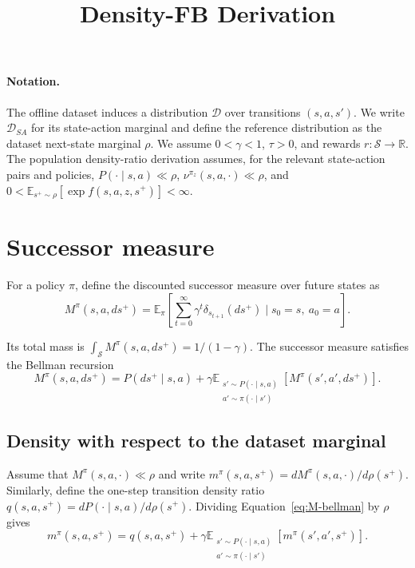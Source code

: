\documentclass[11pt]{article}
\title{Density-FB Derivation}
\date{}
\begin{document}
\maketitle

\paragraph{Notation.}
The offline dataset induces a distribution $\mathcal D$ over transitions $(s,a,s')$. 
We write $\mathcal D_{SA}$ for its state-action marginal and define the reference distribution as the dataset next-state marginal $\rho$. 
We assume $0<\gamma<1$, $\tau>0$, and rewards $r:\mathcal S\rightarrow\mathbb R$. 
The population density-ratio derivation assumes, for the relevant state-action pairs and policies, $P(\cdot\mid s,a)\ll\rho$, $\nu^{\pi_z}(s,a,\cdot)\ll\rho$, and $0<\mathbb E_{s^+\sim\rho}[\exp f(s,a,z,s^+)]<\infty$. 


\section{Successor measure}
For a policy $\pi$, define the discounted successor measure over future states as
\begin{equation}
    M^\pi(s,a,ds^+) = \mathbb E_\pi\left[\sum_{t=0}^{\infty}\gamma^t\delta_{s_{t+1}}(ds^+) \mid s_0=s,\ a_0=a\right].
    \label{eq:M-definition}
\end{equation}

Its total mass is $\int_{\mathcal S}M^\pi(s,a,ds^+)=1/(1-\gamma)$. 
The successor measure satisfies the Bellman recursion
\begin{equation}
    M^\pi(s,a,ds^+) = P(ds^+\mid s,a) + \gamma\mathbb E_{\substack{s'\sim P(\cdot\mid s,a)\\a'\sim\pi(\cdot\mid s')}}\left[M^\pi(s',a',ds^+)\right].
    \label{eq:M-bellman}
\end{equation}

\subsection{Density with respect to the dataset marginal}

Assume that $M^\pi(s,a,\cdot)\ll\rho$ and write $m^\pi(s,a,s^+)=dM^\pi(s,a,\cdot)/d\rho(s^+)$. 
Similarly, define the one-step transition density ratio $q(s,a,s^+)=dP(\cdot\mid s,a)/d\rho(s^+)$. 
Dividing Equation~\eqref{eq:M-bellman} by $\rho$ gives
\[
    m^\pi(s,a,s^+) = q(s,a,s^+) + \gamma\mathbb E_{\substack{s'\sim P(\cdot\mid s,a)\\a'\sim\pi(\cdot\mid s')}}\left[m^\pi(s',a',s^+)\right].
\]
\end{document}

